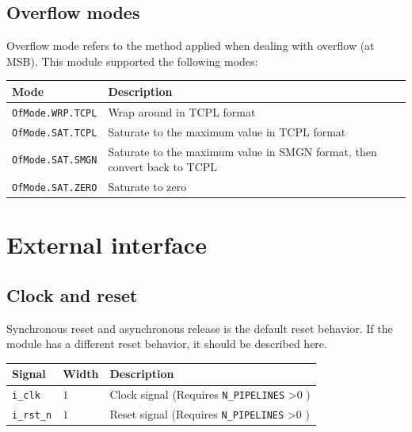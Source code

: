\documentclass[a4paper, oneside]{report}
\begin{document}
        \subsection{Overflow modes}\label{ch:func:sec:param:subsec:OfMode}
            Overflow mode refers to the method applied when dealing with overflow (at MSB). This module supported the following modes:
            \begin{longtable}{lp{}}
                \toprule
                \textbf{Mode} & \textbf{Description} \\
                \midrule
                \texttt{OfMode.WRP.TCPL} & Wrap around in TCPL format \\
                \texttt{OfMode.SAT.TCPL} & Saturate to the maximum value in TCPL format \\
                \texttt{OfMode.SAT.SMGN} & Saturate to the maximum value in SMGN format, then convert back to TCPL \\
                \texttt{OfMode.SAT.ZERO} & Saturate to zero \\
                \bottomrule
            \end{longtable}           
        \section{External interface}
            \subsection{Clock and reset}
                Synchronous reset and asynchronous release is the default reset behavior. If the module has a different reset behavior, it should be described here.
                \begin{longtable}{lll}
                    \toprule
                    \textbf{Signal}      & \textbf{Width}    & \textbf{Description} \\
                    \midrule
                    \texttt{i\_clk}      & $1$                 & Clock signal (Requires \texttt{N\_PIPELINES} >0 ) \\
                    \texttt{i\_rst\_n}   & $1$                 & Reset signal (Requires \texttt{N\_PIPELINES} >0 ) \\
                    \bottomrule
                \end{longtable}
\end{document}
